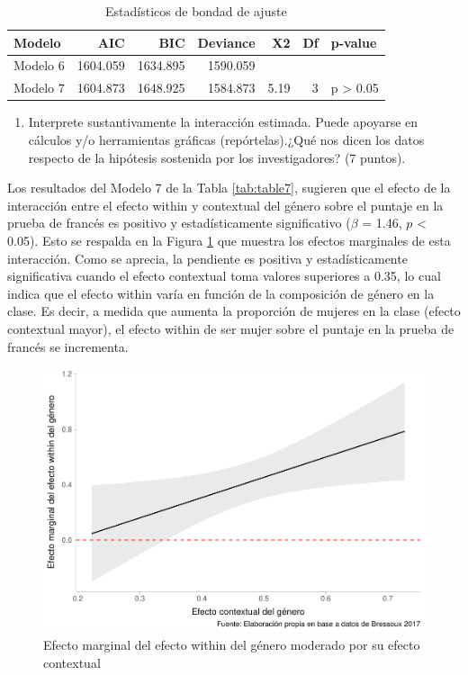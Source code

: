 \documentclass[
  12pt,
  a4paper,
]{article}
\providecommand{\tightlist}{%
  \setlength{\itemsep}{0pt}\setlength{\parskip}{0pt}}
\begin{document}
\begin{table}[!h]

\caption{\label{tab:table8}\label{tab:table8} Estadísticos de bondad de ajuste}
\centering
\begin{tabular}[t]{>{\raggedright\arraybackslash}p{2cm}rrrrrl}
\toprule
\textbf{Modelo} & \textbf{AIC} & \textbf{BIC} & \textbf{Deviance} & \textbf{X2} & \textbf{Df} & \textbf{p-value}\\
\midrule
Modelo 6 & 1604.059 & 1634.895 & 1590.059 &  &  & \\
Modelo 7 & 1604.873 & 1648.925 & 1584.873 & 5.19 & 3 & p > 0.05\\
\bottomrule
\end{tabular}
\end{table}

\begin{enumerate}
\def\labelenumi{\alph{enumi})}
\setcounter{enumi}{2}
\tightlist
\item
  Interprete sustantivamente la interacción estimada. Puede apoyarse en cálculos y/o herramientas gráficas (repórtelas).¿Qué nos dicen los datos respecto de la hipótesis sostenida por los investigadores? (7 puntos).
\end{enumerate}

Los resultados del Modelo 7 de la Tabla \ref{tab:table7}, sugieren que el efecto de la interacción entre el efecto within y contextual del género sobre el puntaje en la prueba de francés es positivo y estadísticamente significativo (\(\beta\) = 1.46, \(p\) \textless{} 0.05). Esto se respalda en la Figura \ref{fig:fig2} que muestra los efectos marginales de esta interacción. Como se aprecia, la pendiente es positiva y estadísticamente significativa cuando el efecto contextual toma valores superiores a 0.35, lo cual indica que el efecto within varía en función de la composición de género en la clase. Es decir, a medida que aumenta la proporción de mujeres en la clase (efecto contextual mayor), el efecto within de ser mujer sobre el puntaje en la prueba de francés se incrementa.

\begin{figure}

{\centering \includegraphics[width=0.8\linewidth]{02-guia_files/figure-latex/fig2-1} 

}

\caption{Efecto marginal del efecto within del género moderado por su efecto contextual}\label{fig:fig2}
\end{figure}
\end{document}
